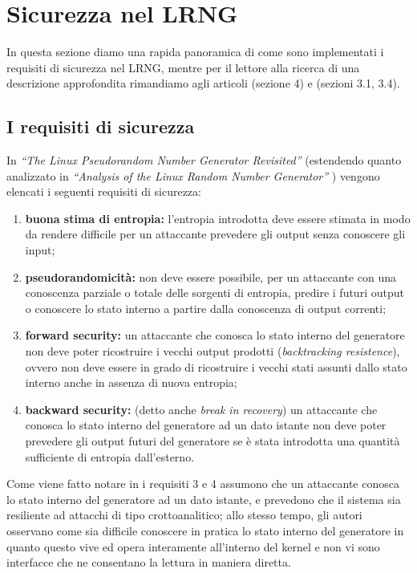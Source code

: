 \documentclass{article}
\begin{document}
  

 \section{Sicurezza nel LRNG}\label{sicurezza}
 In questa sezione diamo una rapida panoramica di come sono implementati
 i requisiti di sicurezza nel LRNG, mentre per il lettore alla ricerca di una
 descrizione approfondita rimandiamo agli articoli \cite{lach} (sezione 4) e
 \cite{gutt} (sezioni 3.1, 3.4).
 
 \subsection{I requisiti di sicurezza}\label{requisitiSicurezza}
 In \emph{``The Linux Pseudorandom Number Generator Revisited''}
 \cite{lach} (estendendo quanto analizzato in \emph{``Analysis of the Linux
 Random Number Generator''} \cite{gutt}) vengono elencati i seguenti requisiti
 di sicurezza:
 \begin{enumerate}
   \item \textbf{buona stima di entropia:} l'entropia introdotta deve essere
   stimata in modo da rendere difficile per un attaccante prevedere gli output senza
   conoscere gli input;
   \item \textbf{pseudorandomicità:} non deve essere possibile, per un
   attaccante con una conoscenza parziale o totale delle sorgenti di entropia,
   predire i futuri output o conoscere lo stato interno a partire dalla
   conoscenza di output correnti;
   \item \textbf{forward security:} un attaccante che conosca lo stato interno
   del generatore non deve poter ricostruire i vecchi output prodotti
   (\emph{backtracking resistence}), ovvero non deve essere in grado di
   ricostruire i vecchi stati assunti dallo stato interno anche in assenza di
   nuova entropia;
   \item \textbf{backward security:} (detto anche \emph{break in recovery}) un
   attaccante che conosca lo stato interno del generatore ad un dato istante
   non deve poter prevedere gli output futuri del generatore se è stata
   introdotta una quantità sufficiente di entropia dall'esterno.
 \end{enumerate}
 Come viene fatto notare in \cite{lach} i requisiti 3 e 4 assumono che un
 attaccante conosca lo stato interno del generatore ad un dato istante, e
 prevedono che il sistema sia resiliente ad attacchi di tipo crottoanalitico;
 allo stesso tempo, gli autori osservano come sia difficile conoscere in
 pratica lo stato interno del generatore in quanto questo vive ed opera
 interamente all'interno del kernel e non vi sono interfacce che ne consentano
 la lettura in maniera diretta.
 
\end{document}
